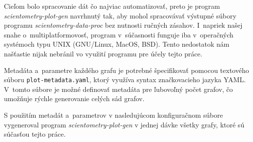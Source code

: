 Cieľom bolo spracovanie dát čo najviac automatizovať, preto je program
\emph{scientometry-plot-gen} navrhnutý tak, aby mohol spracovávať výstupné
súbory programu \emph{scientometry-data-proc} bez nutnosti ručných zásahov.
I~napriek našej snahe o~multiplatformovosť, program v~súčasnosti funguje iba
v~operačných systémoch typu UNIX (GNU/Linux, MacOS, BSD).  Tento nedostatok nám
našťastie nijak nebránil vo využití programu pre účely tejto práce.

Metadáta a~parametre každého grafu je potrebné špecifikovať pomocou textového
súboru \verb|plot-metadata.yaml|, ktorý využíva syntax značkovacieho jazyka
YAML.  V~tomto súbore je možné definovať metadáta pre ľubovoľný počet grafov, čo
umožňuje rýchle generovanie celých sád grafov.

S použitím metadát a~parametrov v nasledujúcom konfiguračnom súbore vygeneroval
program \emph{scientometry-plot-gen} v jednej dávke všetky grafy, ktoré sú
súčasťou tejto práce.


